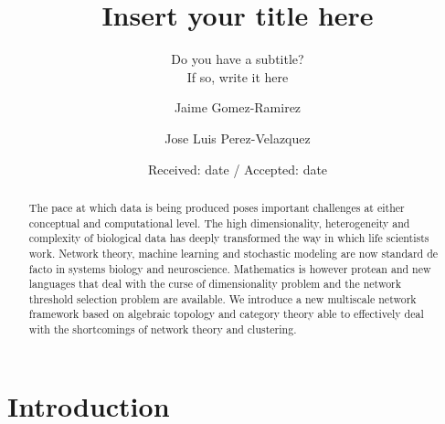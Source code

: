 \documentclass[onecollarge,runningheads]{svjour2}
\begin{document}
\title{Insert your title here%
}
\subtitle{Do you have a subtitle?\\ If so, write it here}
\author{Jaime Gomez-Ramirez        \and
        Jose Luis Perez-Velazquez %
}
\date{Received: date / Accepted: date}
\maketitle

\begin{abstract}
The pace at which data is being produced poses important challenges at either conceptual and computational level. The high dimensionality, heterogeneity and complexity of biological data has deeply transformed the way in which life scientists work. Network theory, machine learning and stochastic modeling are now standard de facto in systems biology and neuroscience. Mathematics is however protean and new languages that deal with the curse of dimensionality problem and the network threshold selection problem are available. We introduce a new multiscale network framework based on algebraic topology and category theory able to effectively deal with the shortcomings of network theory and clustering.

\end{abstract}

\section{Introduction}
\end{document}
